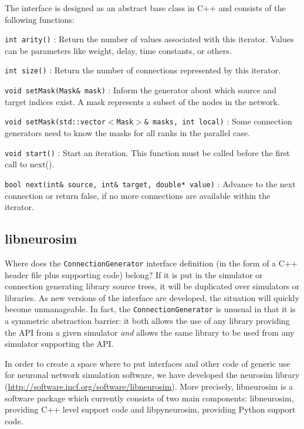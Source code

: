 \documentclass{frontiersSCNS} %
\begin{document}
The interface is designed as an abstract base class in C++ and
consists of the following functions:

\begin{unlist}
\item[\tt int arity()]: Return the number of values associated with this
  iterator. Values can be parameters like weight, delay, time
  constants, or others.
\item[\tt int size()]: Return the number of connections represented by
  this iterator.
\item[\tt void setMask(Mask\& mask)]: Inform the generator about which
  source and target indices exist. A mask represents a subset of the
  nodes in the network.
\item[\tt void setMask(std::vector$<$Mask$>$\& masks, int local)]: Some
  connection generators need to know the masks for all ranks in the
  parallel case.
\item[\tt void start()]: Start an iteration. This function must be called
  before the first call to next().
\item[\tt bool next(int\& source, int\& target, double* value)]: Advance
  to the next connection or return false, if no more connections are
  available within the iterator.
\end{unlist}

\subsection{libneurosim}
Where does the \verb|ConnectionGenerator| interface definition (in the
form of a C++ header file plus supporting code) belong?  If it is put
in the simulator or connection generating library source trees, it
will be duplicated over simulators or libraries.  As new versions of
the interface are developed, the situation will quickly become
unmanageable.  In fact, the \verb|ConnectionGenerator| is unusual in
that it is a symmetric abstraction barrier: it both allows the use of
any library providing the API from a given simulator \emph{and} allows
the same library to be used from any simulator supporting the API.

In order to create a space where to put interfaces and other code of
generic use for neuronal network simulation software, we have
developed the neurosim library
(\url{http://software.incf.org/software/libneurosim}).  More
precisely, libneurosim is a software package which currently consists
of two main components: libneurosim, providing C++ level support code
and libpyneurosim, providing Python support code.
\end{document}
